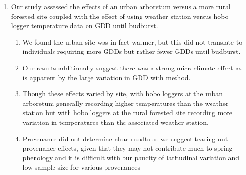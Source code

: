 \documentclass{article}\usepackage[]{graphicx}\usepackage[]{color}
\begin{document}
\begin{enumerate} 
\item Our study assessed the effects of an urban arboretum versus a more rural forested site coupled with the effect of using weather station versus hobo logger temperature data on GDD until budburst.
  \begin{enumerate} 
  \item We found the urban site was in fact warmer, but this did not translate to individuals requiring more GDDs but rather fewer GDDs until budburst.
  \item Our results additionally suggest there was a strong microclimate effect as is apparent by the large variation in GDD with method.
  \item Though these effects varied by site, with hobo loggers at the urban arboretum generally recording higher temperatures than the weather station but with hobo loggers at the rural forested site recording more variation in temperatures than the associated weather station.
  \item Provenance did not determine clear results so we suggest teasing out provenance effects, given that they may not contribute much to spring phenology \citep{Gauzere2017} and it is difficult with our paucity of latitudinal variation and low sample size for various provenances. 
  \end{enumerate}
  \end{enumerate}
\end{document}
